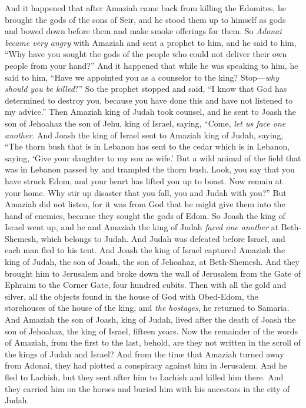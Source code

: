 \begin{biblechapter}
\verse And it happened that after Amaziah came back from killing the Edomites, he brought the gods of the sons of Seir, and he stood them up to himself as gods and bowed down before them and make smoke offerings for them.
\verse So \textit{Adonai became very angry} with Amaziah and sent a prophet to him, and he said to him, “Why have you sought the gods of the people who could not deliver their own people from your hand?”
\verse And it happened that while he was speaking to him, he said to him, “Have we appointed you as a counselor to the king? Stop—\textit{why should you be killed}?” So the prophet stopped and said, “I know that God has determined to destroy you, because you have done this and have not listened to my advice.”
\verse Then Amaziah king of Judah took counsel, and he sent to Joash the son of Jehoahaz the son of Jehu, king of Israel, saying, “Come, \textit{let us face one another}.
\verse And Joash the king of Israel sent to Amaziah king of Judah, saying, “The thorn bush that is in Lebanon has sent to the cedar which is in Lebanon, saying, ‘Give your daughter to my son as wife.’ But a wild animal of the field that was in Lebanon passed by and trampled the thorn bush.
\verse Look, you say that you have struck Edom, and your heart has lifted you up to boast. Now remain at your home. Why stir up disaster that you fall, you and Judah with you?”
\verse But Amaziah did not listen, for it was from God that he might give them into the hand of enemies, because they sought the gods of Edom.
\verse So Joash the king of Israel went up, and he and Amaziah the king of Judah \textit{faced one another} at Beth-Shemesh, which belongs to Judah.
\verse And Judah was defeated before Israel, and each man fled to his tent.
\verse And Joash the king of Israel captured Amaziah the king of Judah, the son of Joash, the son of Jehoahaz, at Beth-Shemesh. And they brought him to Jerusalem and broke down the wall of Jerusalem from the Gate of Ephraim to the Corner Gate, four hundred cubits.
\verse Then with all the gold and silver, all the objects found in the house of God with Obed-Edom, the storehouses of the house of the king, and \textit{the hostages}, he returned to Samaria.
\verse And Amaziah the son of Joash, king of Judah, lived after the death of Joash the son of Jehoahaz, the king of Israel, fifteen years.
\verse Now the remainder of the words of Amaziah, from the first to the last, behold, are they not written in the scroll of the kings of Judah and Israel?
\verse And from the time that Amaziah turned away from Adonai, they had plotted a conspiracy against him in Jerusalem. And he fled to Lachish, but they sent after him to Lachish and killed him there.
\verse And they carried him on the horses and buried him with his ancestors in the city of Judah.
\end{biblechapter}

